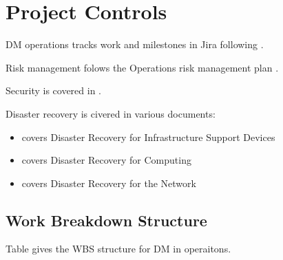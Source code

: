 \section{Project Controls} \label{sec:control}
DM operations tracks work and milestones in Jira following .

Risk management folows the Operations risk management plan .

Security is covered in \cite{RTN-030}.

Disaster recovery is civered in various documents:

\begin{itemize}
\item {} covers Disaster Recovery for Infrastructure Support Devices
\item {} covers Disaster Recovery for Computing
\item {} covers Disaster Recovery for the  Network
\end{itemize}


\subsection{Work Breakdown Structure} \label{sec:wbs}
Table  gives the WBS structure for DM in operaitons.



